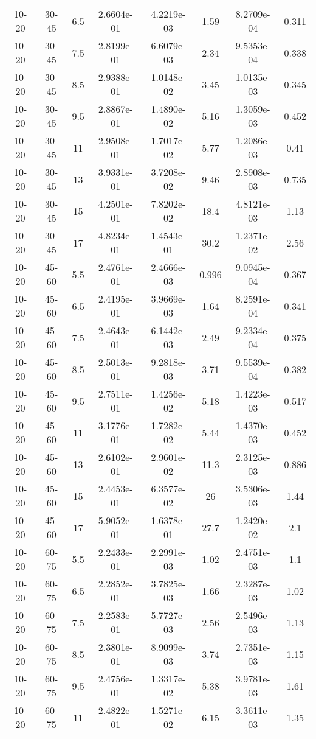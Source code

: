 \begin{longtable}{|cccccccc|}
10-20 & 30-45 & 6.5 & 2.6604e-01 & 4.2219e-03 & 1.59 & 8.2709e-04 & 0.311 \\ 
10-20 & 30-45 & 7.5 & 2.8199e-01 & 6.6079e-03 & 2.34 & 9.5353e-04 & 0.338 \\ 
10-20 & 30-45 & 8.5 & 2.9388e-01 & 1.0148e-02 & 3.45 & 1.0135e-03 & 0.345 \\ 
10-20 & 30-45 & 9.5 & 2.8867e-01 & 1.4890e-02 & 5.16 & 1.3059e-03 & 0.452 \\ 
10-20 & 30-45 & 11 & 2.9508e-01 & 1.7017e-02 & 5.77 & 1.2086e-03 & 0.41 \\ 
10-20 & 30-45 & 13 & 3.9331e-01 & 3.7208e-02 & 9.46 & 2.8908e-03 & 0.735 \\ 
10-20 & 30-45 & 15 & 4.2501e-01 & 7.8202e-02 & 18.4 & 4.8121e-03 & 1.13 \\ 
10-20 & 30-45 & 17 & 4.8234e-01 & 1.4543e-01 & 30.2 & 1.2371e-02 & 2.56 \\ 
\hline
10-20 & 45-60 & 5.5 & 2.4761e-01 & 2.4666e-03 & 0.996 & 9.0945e-04 & 0.367 \\ 
10-20 & 45-60 & 6.5 & 2.4195e-01 & 3.9669e-03 & 1.64 & 8.2591e-04 & 0.341 \\ 
10-20 & 45-60 & 7.5 & 2.4643e-01 & 6.1442e-03 & 2.49 & 9.2334e-04 & 0.375 \\ 
10-20 & 45-60 & 8.5 & 2.5013e-01 & 9.2818e-03 & 3.71 & 9.5539e-04 & 0.382 \\ 
10-20 & 45-60 & 9.5 & 2.7511e-01 & 1.4256e-02 & 5.18 & 1.4223e-03 & 0.517 \\ 
10-20 & 45-60 & 11 & 3.1776e-01 & 1.7282e-02 & 5.44 & 1.4370e-03 & 0.452 \\ 
10-20 & 45-60 & 13 & 2.6102e-01 & 2.9601e-02 & 11.3 & 2.3125e-03 & 0.886 \\ 
10-20 & 45-60 & 15 & 2.4453e-01 & 6.3577e-02 & 26 & 3.5306e-03 & 1.44 \\ 
10-20 & 45-60 & 17 & 5.9052e-01 & 1.6378e-01 & 27.7 & 1.2420e-02 & 2.1 \\ 
\hline
10-20 & 60-75 & 5.5 & 2.2433e-01 & 2.2991e-03 & 1.02 & 2.4751e-03 & 1.1 \\ 
10-20 & 60-75 & 6.5 & 2.2852e-01 & 3.7825e-03 & 1.66 & 2.3287e-03 & 1.02 \\ 
10-20 & 60-75 & 7.5 & 2.2583e-01 & 5.7727e-03 & 2.56 & 2.5496e-03 & 1.13 \\ 
10-20 & 60-75 & 8.5 & 2.3801e-01 & 8.9099e-03 & 3.74 & 2.7351e-03 & 1.15 \\ 
10-20 & 60-75 & 9.5 & 2.4756e-01 & 1.3317e-02 & 5.38 & 3.9781e-03 & 1.61 \\ 
10-20 & 60-75 & 11 & 2.4822e-01 & 1.5271e-02 & 6.15 & 3.3611e-03 & 1.35 \\ 

\end{longtable}
